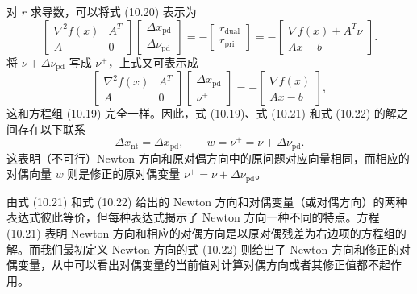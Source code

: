 \documentclass[UTF8, 12pt, fontset=fandol, oneside]{ctexart}
\begin{document}
对 $r$ 求导数，可以将式 (10.20) 表示为
\begin{equation}
\begin{bmatrix}
\nabla^2 f(x) & A^T\\
A & 0
\end{bmatrix}
\begin{bmatrix}
\Delta x_{\mathrm{pd}}\\
\Delta\nu_{\mathrm{pd}}
\end{bmatrix}
=-
\begin{bmatrix}
r_{\mathrm{dual}}\\
r_{\mathrm{pri}}
\end{bmatrix}
=-
\begin{bmatrix}
\nabla f(x)+A^T\nu\\
Ax-b
\end{bmatrix}.
\tag{10.21}
\end{equation}
将 $\nu+\Delta\nu_{\mathrm{pd}}$ 写成 $\nu^+$，上式又可表示成
\begin{equation}
\begin{bmatrix}
\nabla^2 f(x) & A^T\\
A & 0
\end{bmatrix}
\begin{bmatrix}
\Delta x_{\mathrm{pd}}\\
\nu^+
\end{bmatrix}
=-
\begin{bmatrix}
\nabla f(x)\\
Ax-b
\end{bmatrix},
\tag{10.22}
\end{equation}
这和方程组 (10.19) 完全一样。因此，式 (10.19)、式 (10.21) 和式 (10.22) 的解之间存在以下联系
\[
\Delta x_{\mathrm{nt}}=\Delta x_{\mathrm{pd}},\qquad
w=\nu^+=\nu+\Delta\nu_{\mathrm{pd}}.
\]
这表明（不可行）Newton 方向和原对偶方向中的原问题对应向量相同，而相应的对偶向量 $w$ 则是修正的原对偶变量 $\nu^+=\nu+\Delta\nu_{\mathrm{pd}}$。

由式 (10.21) 和式 (10.22) 给出的 Newton 方向和对偶变量（或对偶方向）的两种表达式彼此等价，但每种表达式揭示了 Newton 方向一种不同的特点。方程 (10.21) 表明 Newton 方向和相应的对偶方向是以原对偶残差为右边项的方程组的解。而我们最初定义 Newton 方向的式 (10.22) 则给出了 Newton 方向和修正的对偶变量，从中可以看出对偶变量的当前值对计算对偶方向或者其修正值都不起作用。
\end{document}
